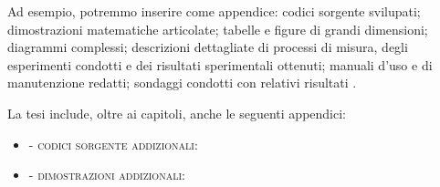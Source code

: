 \medskip

Ad esempio, potremmo inserire come appendice: codici sorgente svilupati; dimostrazioni matematiche articolate; tabelle e figure di grandi dimensioni; diagrammi complessi; descrizioni dettagliate di processi di misura, degli esperimenti condotti e dei risultati sperimentali ottenuti; manuali d'uso e di manutenzione redatti; sondaggi condotti con relativi risultati \cite{tuni2019guide}.

\medskip

La tesi include, oltre ai capitoli, anche le seguenti appendici:

\begin{itemize}

\item {} - \textsc{codici sorgente addizionali}:

\item {} - \textsc{dimostrazioni addizionali}:

\end{itemize}